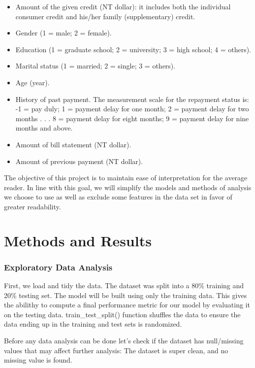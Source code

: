 \documentclass[
]{article}
\providecommand{\tightlist}{%
  \setlength{\itemsep}{0pt}\setlength{\parskip}{0pt}}
\begin{document}
\begin{itemize}
\tightlist
\item
  Amount of the given credit (NT dollar): it includes both the
  individual consumer credit and his/her family (supplementary) credit.
\item
  Gender (1 = male; 2 = female).
\item
  Education (1 = graduate school; 2 = university; 3 = high school; 4 =
  others).
\item
  Marital status (1 = married; 2 = single; 3 = others).
\item
  Age (year).
\item
  History of past payment. The measurement scale for the repayment
  status is: -1 = pay duly; 1 = payment delay for one month; 2 = payment
  delay for two months . . . 8 = payment delay for eight months; 9 =
  payment delay for nine months and above.
\item
  Amount of bill statement (NT dollar).
\item
  Amount of previous payment (NT dollar).
\end{itemize}

The objective of this project is to maintain ease of interpretation for
the average reader. In line with this goal, we will simplify the models
and methods of analysis we choose to use as well as exclude some
features in the data set in favor of greater readability.

\hypertarget{methods-and-results}{%
\section{Methods and Results}\label{methods-and-results}}

\hypertarget{exploratory-data-analysis}{%
\subsubsection{Exploratory Data
Analysis}\label{exploratory-data-analysis}}

First, we load and tidy the data. The dataset was split into a 80\%
training and 20\% testing set. The model will be built using only the
training data. This gives the abilithy to compute a final performance
metric for our model by evaluating it on the testing data.
train\_test\_split() function shuffles the data to ensure the data
ending up in the training and test sets is randomized.

Before any data analysis can be done let's check if the dataset has
null/missing values that may affect further analysis: The dataset is
super clean, and no missing value is found.
\end{document}
